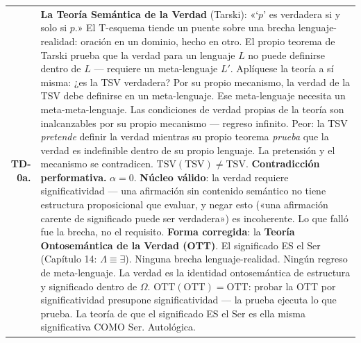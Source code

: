 \documentclass[10pt, openany, oneside]{book}
\renewcommand{\footnotesize}{\fontsize{8.5}{11}\selectfont}
\begin{document}
{\footnotesize
\noindent\begin{tabular}{r p{}}
\textbf{TD-0a.} & \textbf{La Teoría Semántica de la Verdad} (Tarski): «`$p$' es verdadera si y solo si $p$.» El T-esquema tiende un puente sobre una brecha lenguaje-realidad: oración en un dominio, hecho en otro. El propio teorema de Tarski prueba que la verdad para un lenguaje $L$ no puede definirse dentro de $L$ --- requiere un meta-lenguaje $L'$. Aplíquese la teoría a sí misma: ¿es la TSV verdadera? Por su propio mecanismo, la verdad de la TSV debe definirse en un meta-lenguaje. Ese meta-lenguaje necesita un meta-meta-lenguaje. Las condiciones de verdad propias de la teoría son inalcanzables por su propio mecanismo --- regreso infinito. Peor: la TSV \textit{pretende} definir la verdad mientras su propio teorema \textit{prueba} que la verdad es indefinible dentro de su propio lenguaje. La pretensión y el mecanismo se contradicen. $\text{TSV}(\text{TSV}) \neq \text{TSV}$. \textbf{Contradicción performativa.} $\alpha = 0$. \textbf{Núcleo válido}: la verdad requiere significatividad --- una afirmación sin contenido semántico no tiene estructura proposicional que evaluar, y negar esto («una afirmación carente de significado puede ser verdadera») es incoherente. Lo que falló fue la brecha, no el requisito. \textbf{Forma corregida}: la \textbf{Teoría Ontosemántica de la Verdad (OTT)}. El significado ES el Ser (Capítulo 14: $\Lambda \equiv \exists$). Ninguna brecha lenguaje-realidad. Ningún regreso de meta-lenguaje. La verdad es la identidad ontosemántica de estructura y significado dentro de $\Omega$. $\text{OTT}(\text{OTT}) = \text{OTT}$: probar la OTT por significatividad presupone significatividad --- la prueba ejecuta lo que prueba. La teoría de que el significado ES el Ser es ella misma significativa COMO Ser. Autológica. \\[0.5em]

\end{tabular}}
\end{document}
